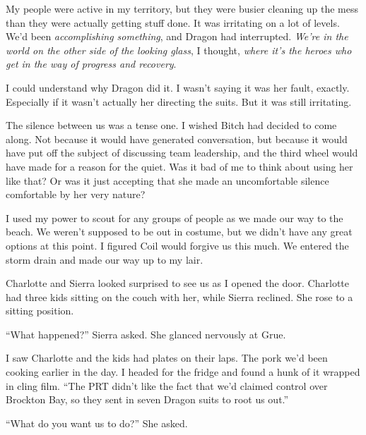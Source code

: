 \sectionbreak



My people were active in my territory, but they were busier cleaning up the mess than they were actually getting stuff done.  It was irritating on a lot of levels.  We'd been \emph{accomplishing something}, and Dragon had interrupted.  \emph{We're in the world on the other side of the looking glass}, I thought, \emph{where it's the heroes who get in the way of progress and recovery}.



I could understand why Dragon did it.  I wasn't saying it was her fault, exactly.  Especially if it wasn't actually her directing the suits.  But it was still irritating.



The silence between us was a tense one.  I wished Bitch had decided to come along.  Not because it would have generated conversation, but because it would have put off the subject of discussing team leadership, and the third wheel would have made for a reason for the quiet.  Was it bad of me to think about using her like that?  Or was it just accepting that she made an uncomfortable silence comfortable by her very nature?



I used my power to scout for any groups of people as we made our way to the beach.  We weren't supposed to be out in costume, but we didn't have any great options at this point.  I figured Coil would forgive us this much.  We entered the storm drain and made our way up to my lair.



Charlotte and Sierra looked surprised to see us as I opened the door.  Charlotte had three kids sitting on the couch with her, while Sierra reclined.  She rose to a sitting position.



``What happened?'' Sierra asked.  She glanced nervously at Grue.



I saw Charlotte and the kids had plates on their laps.  The pork we'd been cooking earlier in the day.  I headed for the fridge and found a hunk of it wrapped in cling film.  ``The PRT didn't like the fact that we'd claimed control over Brockton Bay, so they sent in seven Dragon suits to root us out.''



``What do you want us to do?'' She asked.



